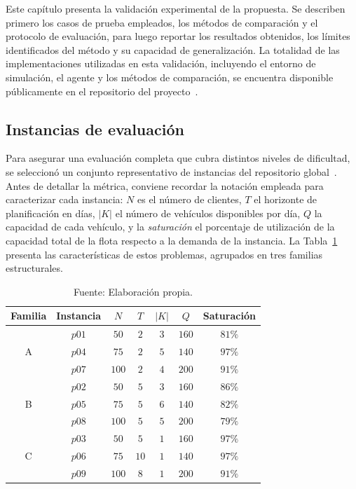 Este capítulo presenta la validación experimental de la propuesta. Se describen primero los casos de prueba empleados, los métodos de comparación y el protocolo de evaluación, para luego reportar los resultados obtenidos, los límites identificados del método y su capacidad de generalización. La totalidad de las implementaciones utilizadas en esta validación, incluyendo el entorno de simulación, el agente y los métodos de comparación, se encuentra disponible públicamente en el repositorio del proyecto~\cite{RepositorioPVRP}.

\subsection{Instancias de evaluación} \label{sec:Instanciasdeevaluacion}
Para asegurar una evaluación completa que cubra distintos niveles de dificultad, se seleccionó un conjunto representativo de instancias del repositorio global~\cite{NEO2013}. Antes de detallar la métrica, conviene recordar la notación empleada para caracterizar cada instancia: $N$ es el número de clientes, $T$ el horizonte de planificación en días, $|K|$ el número de vehículos disponibles por día, $Q$ la capacidad de cada vehículo, y la \textit{saturación} el porcentaje de utilización de la capacidad total de la flota respecto a la demanda de la instancia. La Tabla~\ref{table:MetodoEvaluacion} presenta las características de estos problemas, agrupados en tres familias estructurales.

\begin{table}[H]
    \centering
    \caption{\label{table:MetodoEvaluacion} Instancias consideradas para la evaluación experimental.}
    \caption*{Fuente: Elaboración propia.}
    \renewcommand{\arraystretch}{1.12}
    \setlength{\tabcolsep}{10pt}
    \begin{tabular}{@{}ccccccc@{}}
        \toprule
        \textbf{Familia} & \textbf{Instancia} & $N$ & $T$ & $|K|$ & $Q$ & \textbf{Saturación} \\
        \midrule
        \multirow{3}{*}{A}
        & $p01$ & $50$  & $2$ & $3$ & $160$ & $81\%$ \\
        & $p04$ & $75$  & $2$ & $5$ & $140$ & $97\%$ \\
        & $p07$ & $100$ & $2$ & $4$ & $200$ & $91\%$ \\
        \midrule
        \multirow{3}{*}{B}
        & $p02$ & $50$  & $5$ & $3$ & $160$ & $86\%$ \\
        & $p05$ & $75$  & $5$ & $6$ & $140$ & $82\%$ \\
        & $p08$ & $100$ & $5$ & $5$ & $200$ & $79\%$ \\
        \midrule
        \multirow{3}{*}{C}
        & $p03$ & $50$  & $5$  & $1$ & $160$ & $97\%$ \\
        & $p06$ & $75$  & $10$ & $1$ & $140$ & $97\%$ \\
        & $p09$ & $100$ & $8$  & $1$ & $200$ & $91\%$ \\
        \bottomrule
    \end{tabular}
\end{table}

